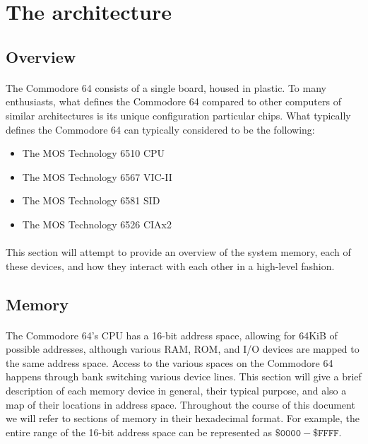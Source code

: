 \documentclass{article}
\begin{document}
\section{The architecture}

\subsection{Overview}
\paragraph{}
The Commodore 64 consists of a single board, housed in plastic. To many enthusiasts, what defines the Commodore 64 compared to other computers of similar architectures is its unique configuration particular chips. What typically defines the Commodore 64 can typically considered to be the following:
\begin{itemize}
\item The MOS Technology 6510 CPU
\item The MOS Technology 6567 VIC-II
\item The MOS Technology 6581 SID
\item The MOS Technology 6526 CIAx2
\end{itemize}
\paragraph{}
This section will attempt to provide an overview of the system memory, each of these devices, and how they interact with each other in a high-level fashion.

\subsection{Memory}
\paragraph{}
The Commodore 64's CPU has a 16-bit address space, allowing for 64KiB of possible addresses, although various RAM, ROM, and I/O devices are mapped to the same address space. Access to the various spaces on the Commodore 64 happens through bank switching various device lines. This section will give a brief description of each memory device in general, their typical purpose, and also a map of their locations in address space. Throughout the course of this document we will refer to sections of memory in their hexadecimal format. For example, the entire range of the 16-bit address space can be represented as $\mathtt{\$0000 - \$FFFF}$.
\end{document}
